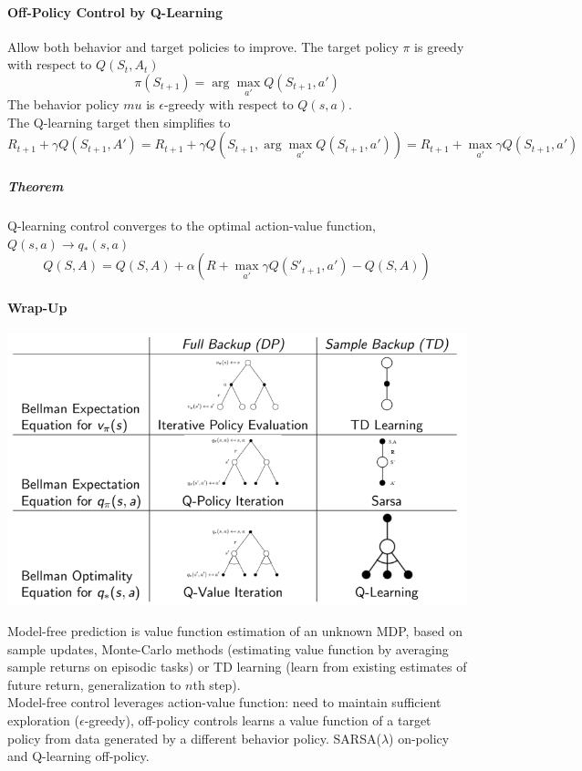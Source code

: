 \documentclass[10pt]{report}
\begin{document}
\paragraph{Off-Policy Control by Q-Learning} Allow both behavior and target policies to improve. The target policy $\pi$ is greedy with respect to $Q(S_t,A_t)$
$$\pi(S_{t+1})=\arg\max_{a'} Q(S_{t+1}, a')$$
The behavior policy $mu$ is $\epsilon$-greedy with respect to $Q(s,a)$.\\
The Q-learning target then simplifies to
$$R_{t+1}+\gamma Q(S_{t+1}, A') = R_{t+1} + \gamma Q(S_{t+1}, \arg\max_{a'} Q(S_{t+1}, a'))= R_{t+1} + \max_{a'} \gamma Q(S_{t+1}, a')$$
\subparagraph{Theorem} Q-learning control converges to the optimal action-value function, $Q(s,a)\rightarrow q_*(s,a)$
$$Q(S,A) = Q(S,A) + \alpha(R + \max_{a'} \gamma Q(S'_{t+1}, a') - Q(S,A))$$
\paragraph{Wrap-Up}
\begin{center}
	\includegraphics[scale=0.5]{175.png}
\end{center}
Model-free prediction is value function estimation of an unknown MDP, based on sample updates, Monte-Carlo methods (estimating value function by averaging sample returns on episodic tasks) or TD learning (learn from existing estimates of future return, generalization to $n$th step).\\
Model-free control leverages action-value function: need to maintain sufficient exploration ($\epsilon$-greedy), off-policy controls learns a value function of a target policy from data generated by a different behavior policy. SARSA($\lambda$) on-policy and Q-learning off-policy.
\end{document}
